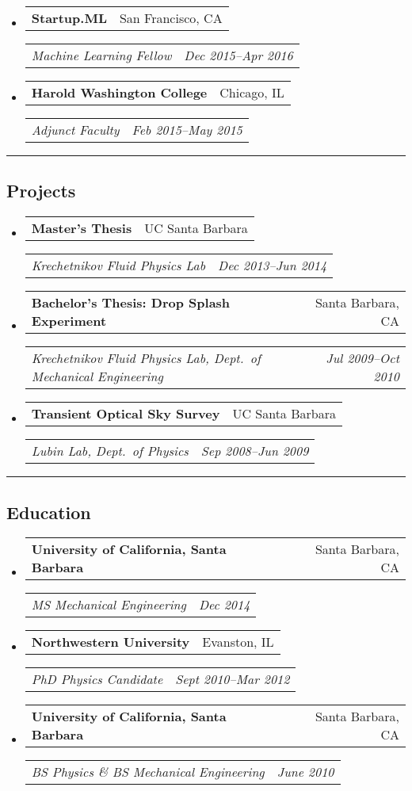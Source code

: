\documentclass[10pt,letterpaper]{article}
\makeatletter
\newcommand{\headerrow}[2]{
\begin{tabular*}{\linewidth}{l@{\extracolsep{\fill}}r}
		#1 &
		#2 \\
	\end{tabular*}
}
\newcommand{\jobitem}[4]{\item \headerrow{\textbf{#1}}{#2}
\headerrow{\emph{#3}}{\emph{#4}}}
\makeatother
\begin{document}
\begin{itemize}
	\jobitem{Startup.ML}{San Francisco, CA}
		    {Machine Learning Fellow}{Dec 2015--Apr 2016}
\end{itemize}

\begin{itemize}
	\jobitem{Harold Washington College}{Chicago, IL}
		    {Adjunct Faculty}{Feb 2015--May 2015}
\end{itemize}


\hrule
\subsection*{Projects}
\begin{itemize}
	\jobitem{Master's Thesis}{UC Santa Barbara}
		    {Krechetnikov Fluid Physics Lab}{Dec 2013--Jun 2014}
	
	\jobitem{Bachelor's Thesis: Drop Splash Experiment}{Santa Barbara, CA}
		    {Krechetnikov Fluid Physics Lab, Dept.~of Mechanical Engineering}{Jul 2009--Oct 2010}
	\jobitem{Transient Optical Sky Survey}{UC Santa Barbara}
		    {Lubin Lab, Dept.~of Physics}{Sep 2008--Jun 2009}
\end{itemize}

\hrule
\subsection*{Education}
\begin{itemize}
	\jobitem{University of California, Santa Barbara}{Santa Barbara, CA}
		    {MS  Mechanical Engineering}{Dec 2014}
	\jobitem{Northwestern University}{Evanston, IL}
		    {PhD Physics Candidate}{Sept 2010--Mar 2012}
	\jobitem{University of California, Santa Barbara}{Santa Barbara, CA}	
		    {BS Physics \&  BS Mechanical Engineering}{June 2010}
\end{itemize}
\end{document}
